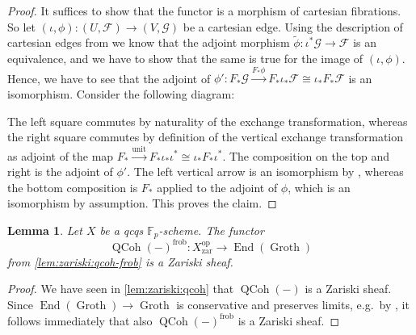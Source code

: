 \documentclass{article}
\theoremstyle{definition}
\theoremstyle{definition}
\theoremstyle{definition}
\theoremstyle{plain}
\newtheorem{lem}[defn]{Lemma}
\theoremstyle{plain}
\theoremstyle{plain}
\theoremstyle{plain}
\theoremstyle{plain}
\theoremstyle{plain}
\theoremstyle{plain}
\theoremstyle{plain}
\theoremstyle{remark}
\theoremstyle{remark}
\theoremstyle{plain}
\theoremstyle{plain}
\theoremstyle{plain}
\theoremstyle{plain}
\theoremstyle{plain}
\newcommand{\Fp}{\mathbb{F}_p}
\newcommand{\op}[1]{#1^{\operatorname{op}}}
\newcommand{\QCoh}[1]{\operatorname{QCoh}(#1)}
\newcommand{\End}[1]{\operatorname{End}(#1)}
\newcommand{\Cat}[1]{\mathcal{#1}}
\newcommand{\Groth}{\operatorname{Groth}}
\newcommand{\zar}{\operatorname{zar}}
\newcommand{\frob}{\operatorname{frob}}
\begin{document}
\begin{proof}
    It suffices to show that the functor is a morphism of cartesian fibrations.
    So let $(\iota, \phi) \colon (U, \Cat F) \to (V, \Cat G)$ be a cartesian edge.
    Using the description of cartesian edges from \cite[\href{https://stacks.math.columbia.edu/tag/04U3}{Lemma 04U3}]{stacks-project}
    we know that the adjoint morphism $\tilde{\phi} \colon \iota^* \Cat G \to \Cat F$ is an equivalence,
    and we have to show that the same is true for the image of $(\iota, \phi)$.
    Hence, we have to see that the adjoint of $\phi' \colon F_* \Cat G \xrightarrow{F_* \phi} F_* \iota_* \Cat F \cong \iota_* F_* \Cat F$
    is an isomorphism. Consider the following diagram:
    \begin{center}
    \end{center}
    The left square commutes by naturality of the exchange transformation, 
    whereas the right square commutes by definition of the vertical exchange transformation as adjoint of the map
    $F_* \xrightarrow{\mathrm{unit}} F_*\iota_*\iota^* \cong \iota_* F_* \iota^*$.
    The composition on the top and right is the adjoint of $\phi'$.
    The left vertical arrow is an isomorphism by \cite[Lemma 2.2.1]{blickle2013cartier},
    whereas the bottom composition is $F_*$ applied to the adjoint of $\phi$,
    which is an isomorphism by assumption.
    This proves the claim.
\end{proof}

\begin{lem} \label{lem:zariski:qcoh-frob-sheaf}
    Let $X$ be a qcqs $\Fp$-scheme.
    The functor
    \begin{equation*}
        \QCoh{-}^{\frob} \colon \op{X}_{\zar} \to \End{\Groth}
    \end{equation*}
    from \cref{lem:zariski:qcoh-frob} is a Zariski sheaf.
\end{lem}
\begin{proof}
    We have seen in \cref{lem:zariski:qcoh} that $\QCoh{-}$ is a Zariski sheaf.
    Since $\End{\Groth} \to \Groth$ is conservative and preserves limits,
    e.g.\ by \cite[Proposition 2.6 (b) and (c)]{cartmod},
    it follows immediately that also $\QCoh{-}^{\frob}$ is a Zariski sheaf.
\end{proof}
\end{document}
